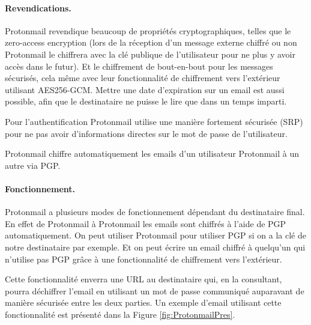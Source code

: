 \paragraph*{Revendications.}
Protonmail revendique beaucoup de propriétés cryptographiques, telles que le zero-access encryption (lors de la réception d'un message externe chiffré ou non Protonmail le chiffrera avec la clé publique de l'utilisateur pour ne plus y avoir accès dans le futur). Et le chiffrement de bout-en-bout pour les messages sécurisés, cela même avec leur fonctionnalité de chiffrement vers l'extérieur utilisant AES256-GCM. Mettre une date d'expiration sur un email est aussi possible, afin que le destinataire ne puisse le lire que dans un temps imparti.

Pour l'authentification Protonmail utilise une manière fortement sécurisée (SRP) pour ne pas avoir d'informations directes sur le mot de passe de l'utilisateur.

Protonmail chiffre automatiquement les emails d'un utilisateur Protonmail à un autre via PGP.
\paragraph*{Fonctionnement.}
Protonmail a plusieurs modes de fonctionnement dépendant du destinataire final. En effet de Protonmail à Protonmail les emails sont chiffrés à l'aide de PGP automatiquement. On peut utiliser Protonmail pour utiliser PGP si on a la clé de notre destinataire par exemple. Et on peut écrire un email chiffré à quelqu'un qui n'utilise pas PGP grâce à une fonctionnalité de chiffrement vers l'extérieur.

Cette fonctionnalité enverra une URL au destinataire qui, en la consultant, pourra déchiffrer l'email en utilisant un mot de passe communiqué auparavant de manière sécurisée entre les deux parties. Un exemple d'email utilisant cette fonctionnalité est présenté dans la Figure \ref{fig:ProtonmailPres}.

